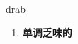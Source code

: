
\begin{frame}
{\huge drab}
\begin{center}
\begin{enumerate}\Large
  \item \textbf{单调乏味的}
\end{enumerate}
\end{center}
\end{frame}
